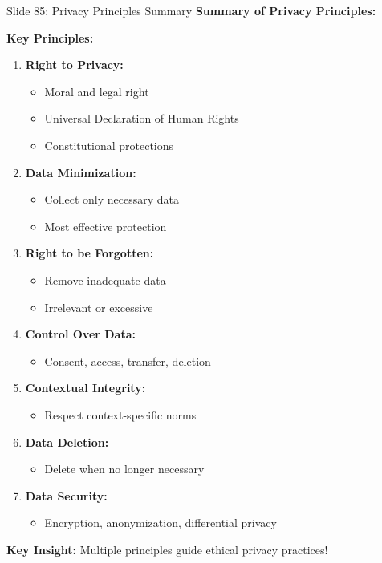 \documentclass[8pt]{beamer}
\begin{document}
	\begin{frame}{Slide 85: Privacy Principles Summary}
		\fontsize{6.5}{7.5}\selectfont
		\textbf{Summary of Privacy Principles:}
		
		\vspace{0.1cm}
		\textbf{Key Principles:}
		\begin{enumerate}
			\item \textbf{Right to Privacy:}
			\begin{itemize}
				\item Moral and legal right
				\item Universal Declaration of Human Rights
				\item Constitutional protections
			\end{itemize}
			\item \textbf{Data Minimization:}
			\begin{itemize}
				\item Collect only necessary data
				\item Most effective protection
			\end{itemize}
			\item \textbf{Right to be Forgotten:}
			\begin{itemize}
				\item Remove inadequate data
				\item Irrelevant or excessive
			\end{itemize}
			\item \textbf{Control Over Data:}
			\begin{itemize}
				\item Consent, access, transfer, deletion
			\end{itemize}
			\item \textbf{Contextual Integrity:}
			\begin{itemize}
				\item Respect context-specific norms
			\end{itemize}
			\item \textbf{Data Deletion:}
			\begin{itemize}
				\item Delete when no longer necessary
			\end{itemize}
			\item \textbf{Data Security:}
			\begin{itemize}
				\item Encryption, anonymization, differential privacy
			\end{itemize}
		\end{enumerate}
		
		\textcolor{myblue}{\textbf{Key Insight:}} Multiple principles guide \textcolor{myblue}{ethical privacy practices}!
	\end{frame}
	
\end{document}
